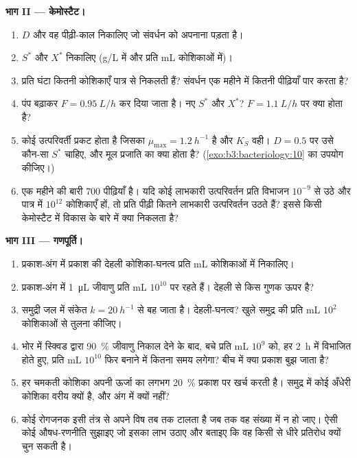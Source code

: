 \begin{problem}
\medskip
\noindent\textbf{भाग II --- केमोस्टैट।}
\begin{enumerate}[resume]
  \item {} $D$ और वह पीढ़ी-काल निकालिए जो संवर्धन को अपनाना
        पड़ता है।
  \item $S^{*}$ और $X^{*}$ निकालिए (g/L में और प्रति mL कोशिकाओं में)।
  \item प्रति घंटा कितनी कोशिकाएँ पात्र से निकलती हैं? संवर्धन एक महीने
        में कितनी पीढ़ियाँ पार करता है?
  \item पंप बढ़ाकर $F = \qty{0.95}{L/h}$ कर दिया जाता है। नए $S^{*}$ और
        $X^{*}$? $F = \qty{1.1}{L/h}$ पर क्या होता है?
  \item कोई उत्परिवर्ती प्रकट होता है जिसका $\mu_{\max} = \qty{1.2}{h^{-1}}$
        है और $K_{S}$ वही। $D = 0.5$ पर उसे कौन-सा $S^{*}$ चाहिए, और
        मूल प्रजाति का क्या होता है? (\cref{exo:b3:bacteriology:10} का
        उपयोग कीजिए।)
  \item एक महीने की बारी $700$ पीढ़ियाँ है। यदि कोई लाभकारी उत्परिवर्तन
        प्रति विभाजन $10^{-9}$ से उठे और पात्र में $10^{12}$
        कोशिकाएँ हों, तो प्रति पीढ़ी कितने लाभकारी उत्परिवर्तन उठते
        हैं? इससे किसी केमोस्टैट में विकास के बारे में क्या निकलता है?
\end{enumerate}

\medskip
\noindent\textbf{भाग III --- गणपूर्ति।}
\begin{enumerate}[resume]
  \item प्रकाश-अंग में प्रकाश की देहली कोशिका-घनत्व प्रति mL कोशिकाओं
        में निकालिए।
  \item प्रकाश-अंग में \qty{1}{\micro L} जीवाणु प्रति mL $10^{10}$ पर
        रहते हैं।  देहली से किस गुणक ऊपर है?
  \item समुद्री जल में संकेत $k = \qty{20}{h^{-1}}$ से बह जाता है।
        देहली-घनत्व? खुले समुद्र की प्रति mL $10^{2}$ कोशिकाओं से तुलना
        कीजिए।
  \item भोर में स्क्विड द्वारा \qty{90}{\%} जीवाणु निकाल देने के बाद,
        बचे प्रति mL $10^{9}$ को, हर \qty{2}{h} में विभाजित होते हुए,
        प्रति mL $10^{10}$ फिर बनाने में कितना समय लगेगा? बीच में क्या
        प्रकाश बुझ जाता है?
  \item हर चमकती कोशिका अपनी ऊर्जा का लगभग \qty{20}{\%} प्रकाश पर
        खर्च करती है। समुद्र में कोई अँधेरी कोशिका वरीय क्यों है, और
        अंग में क्यों नहीं?
  \item कोई रोगजनक इसी तंत्र से अपने विष तब तक टालता है जब तक वह
        संख्या में न हो जाए। ऐसी कोई औषध-रणनीति सुझाइए जो इसका लाभ
        उठाए और बताइए कि वह किसी  से धीरे प्रतिरोध क्यों चुन
        सकती है।
\end{enumerate}


\end{problem}

